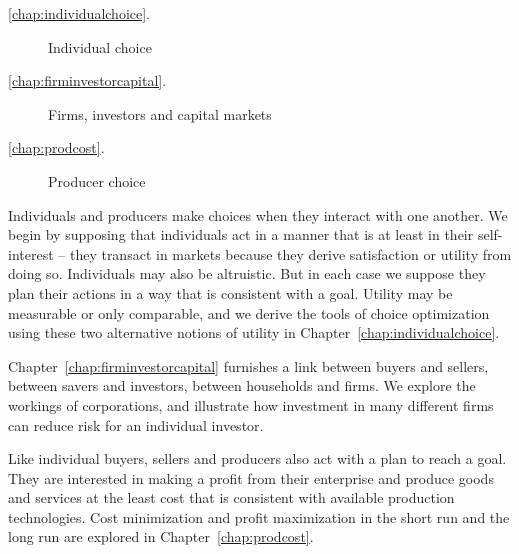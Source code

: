 
{\large\color{parttextcolour}
\begin{description}
\item[\textmd{\ref{chap:individualchoice}.}] Individual choice

\item[\textmd{\ref{chap:firminvestorcapital}.}] Firms, investors and capital markets

\item[\textmd{\ref{chap:prodcost}.}] Producer choice
\end{description}
}

\vspace{1cm}

Individuals and producers make choices when they interact with one another. We begin by supposing that individuals act in a manner that is at least in their self-interest -- they transact in markets because they derive satisfaction or utility from doing so. Individuals may also be altruistic. But in each case we suppose they plan their actions in a way that is consistent with a goal. Utility may be measurable or only comparable, and we derive the tools of choice optimization using these two alternative notions of utility in Chapter~\ref{chap:individualchoice}.

Chapter~\ref{chap:firminvestorcapital} furnishes a link between buyers and sellers, between savers and investors, between households and firms. We explore the workings of corporations, and illustrate how investment in many different firms can reduce risk for an individual investor.

Like individual buyers, sellers and producers also act with a plan to reach a goal. They are interested in making a profit from their enterprise and produce goods and services at the least cost that is consistent with available production technologies. Cost minimization and profit maximization in the short run and the long run are explored in Chapter~\ref{chap:prodcost}.

